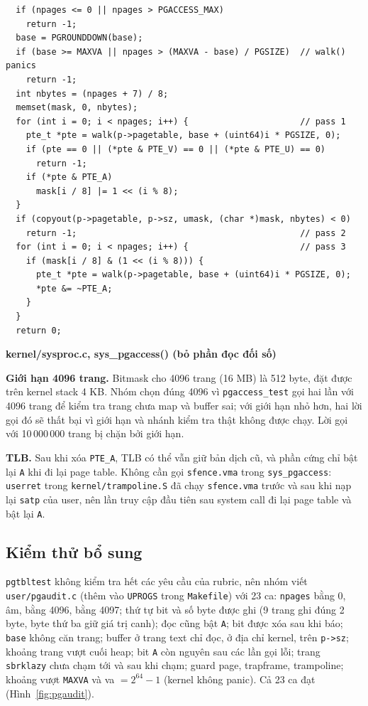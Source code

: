 \documentclass[10pt,a4paper]{article}
\newcommand{\srcname}[1]{{\small\bfseries\color{hcmus}#1}\par\vspace{-2pt}}
\newcommand{\cc}[1]{\texttt{#1}}
\begin{document}
\begin{lstlisting}
  if (npages <= 0 || npages > PGACCESS_MAX)
    return -1;
  base = PGROUNDDOWN(base);
  if (base >= MAXVA || npages > (MAXVA - base) / PGSIZE)  // walk() panics
    return -1;
  int nbytes = (npages + 7) / 8;
  memset(mask, 0, nbytes);
  for (int i = 0; i < npages; i++) {                      // pass 1
    pte_t *pte = walk(p->pagetable, base + (uint64)i * PGSIZE, 0);
    if (pte == 0 || (*pte & PTE_V) == 0 || (*pte & PTE_U) == 0)
      return -1;
    if (*pte & PTE_A)
      mask[i / 8] |= 1 << (i % 8);
  }
  if (copyout(p->pagetable, p->sz, umask, (char *)mask, nbytes) < 0)
    return -1;                                            // pass 2
  for (int i = 0; i < npages; i++) {                      // pass 3
    if (mask[i / 8] & (1 << (i % 8))) {
      pte_t *pte = walk(p->pagetable, base + (uint64)i * PGSIZE, 0);
      *pte &= ~PTE_A;
    }
  }
  return 0;
\end{lstlisting}
\vspace{-2pt}
\srcname{kernel/sysproc.c, sys\_pgaccess() (bỏ phần đọc đối số)}

\textbf{Giới hạn 4096 trang.} Bitmask cho 4096 trang (16 MB) là 512 byte, đặt được trên kernel stack 4 KB. Nhóm chọn đúng 4096 vì \cc{pgaccess\_test} gọi hai lần với 4096 trang để kiểm tra trang chưa map và buffer sai; với giới hạn nhỏ hơn, hai lời gọi đó sẽ thất bại vì giới hạn và nhánh kiểm tra thật không được chạy. Lời gọi với 10\,000\,000 trang bị chặn bởi giới hạn.

\textbf{TLB.} Sau khi xóa \cc{PTE\_A}, TLB có thể vẫn giữ bản dịch cũ, và phần cứng chỉ bật lại \cc{A} khi đi lại page table. Không cần gọi \cc{sfence.vma} trong \cc{sys\_pgaccess}: \cc{userret} trong \cc{kernel/trampoline.S} đã chạy \cc{sfence.vma} trước và sau khi nạp lại \cc{satp} của user, nên lần truy cập đầu tiên sau system call đi lại page table và bật lại \cc{A}.

\subsection{Kiểm thử bổ sung}
\cc{pgtbltest} không kiểm tra hết các yêu cầu của rubric, nên nhóm viết \cc{user/pgaudit.c} (thêm vào \cc{UPROGS} trong \cc{Makefile}) với 23 ca: \cc{npages} bằng 0, âm, bằng 4096, bằng 4097; thứ tự bit và số byte được ghi (9 trang ghi đúng 2 byte, byte thứ ba giữ giá trị canh); đọc cũng bật \cc{A}; bit được xóa sau khi báo; \cc{base} không căn trang; buffer ở trang text chỉ đọc, ở địa chỉ kernel, trên \cc{p->sz}; khoảng trang vượt cuối heap; bit \cc{A} còn nguyên sau các lần gọi lỗi; trang \cc{sbrklazy} chưa chạm tới và sau khi chạm; guard page, trapframe, trampoline; khoảng vượt \cc{MAXVA} và va $= 2^{64} - 1$ (kernel không panic). Cả 23 ca đạt (Hình~\ref{fig:pgaudit}).
\end{document}
